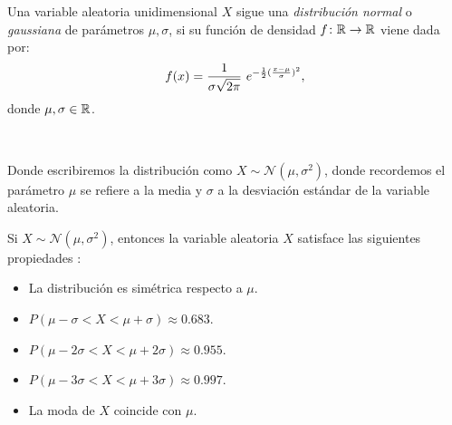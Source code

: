 \documentclass[oneside,openright,titlepage,numbers=noenddot,openany,headinclude,footinclude=true,
cleardoublepage=empty,abstractoff,BCOR=5mm,paper=a4,fontsize=12pt,main=spanish]{scrreprt}
\begin{document}
\begin{definition}
Una variable aleatoria unidimensional $X$ sigue una \textit{distribución normal} o \textit{gaussiana} de parámetros $\mu, \sigma$, si su función de densidad $f\colon \mathbb{R} \to \mathbb{R}$ viene dada por: $$f(x)=\ddfrac{1}{\sigma \sqrt{2\pi}} \ e^{-\frac{1}{2}(\frac{x-\mu}{\sigma})^2},$$
donde $\mu,\sigma\in \mathbb{R}$.
\end{definition}\

Donde escribiremos la distribución como $X \sim \mathcal{N}(\mu, \sigma^2)$, donde recordemos el parámetro $\mu$ se refiere a la media y $\sigma$ a la desviación estándar de la variable aleatoria.\\

\begin{proposition} \label{prop:propnormal}
Si $X \sim \mathcal{N}(\mu, \sigma^2)$, entonces la variable aleatoria $X$ satisface las siguientes propiedades :
\begin{itemize}
    \item La distribución es simétrica respecto a $\mu$.
    \item $P(\mu-\sigma < X < \mu+\sigma)\approx 0.683.$
    \item $P(\mu-2\sigma < X < \mu+2\sigma)\approx 0.955.$
    \item $P(\mu-3\sigma < X < \mu+3\sigma)\approx 0.997.$
    \item La moda de $X$ coincide con $\mu$.
\end{itemize}
\end{proposition}\
\end{document}
